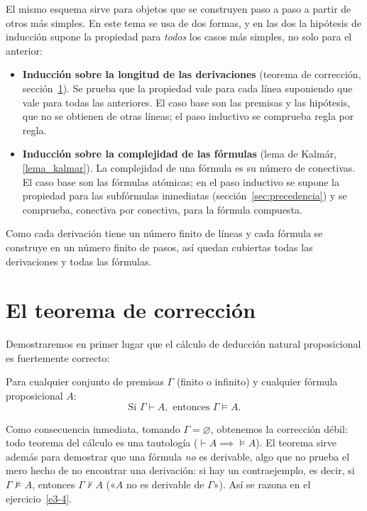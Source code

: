 El mismo esquema sirve para objetos que se construyen paso a paso a partir de otros más simples. En este tema se usa de dos formas, y en las dos la hipótesis de inducción supone la propiedad para \emph{todos} los casos más simples, no solo para el anterior:
\begin{itemize}
    \item \textbf{Inducción sobre la longitud de las derivaciones} (teorema de corrección, sección~\ref{sec:correccion}). Se prueba que la propiedad vale para cada línea suponiendo que vale para todas las anteriores. El caso base son las premisas y las hipótesis, que no se obtienen de otras líneas; el paso inductivo se comprueba regla por regla.
    \item \textbf{Inducción sobre la complejidad de las fórmulas} (lema de Kalmár, \ref{lema_kalmar}). La complejidad de una fórmula es su número de conectivas. El caso base son las fórmulas atómicas; en el paso inductivo se supone la propiedad para las subfórmulas inmediatas (sección~\ref{sec:precedencia}) y se comprueba, conectiva por conectiva, para la fórmula compuesta.
\end{itemize}
Como cada derivación tiene un número finito de líneas y cada fórmula se construye en un número finito de pasos, así quedan cubiertas todas las derivaciones y todas las fórmulas.

\section{El teorema de corrección}\label{sec:correccion}

Demostraremos en primer lugar que el cálculo de deducción natural proposicional es fuertemente correcto:

\begin{theorem}
Para cualquier conjunto de premisas $\Gamma$ (finito o infinito) y cualquier fórmula proposicional $A$:
\[
\text{Si } \Gamma \vdash A, \text{ entonces } \Gamma \models A.
\]
\end{theorem}
Como consecuencia inmediata, tomando $\Gamma = \varnothing$, obtenemos la corrección débil: todo teorema del cálculo es una tautología ($\vdash A \implies \models A$). El teorema sirve además para demostrar que una fórmula \emph{no} es derivable, algo que no prueba el mero hecho de no encontrar una derivación: si hay un contraejemplo, es decir, si $\Gamma \not\models A$, entonces $\Gamma \nvdash A$ («$A$ no es derivable de $\Gamma$»). Así se razona en el ejercicio~\ref{e3-4}.

